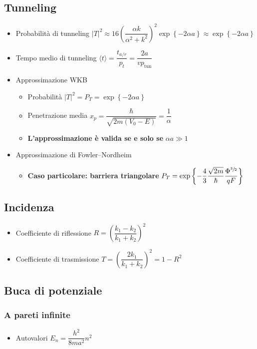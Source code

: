 \documentclass{article}
\begin{document}
\subsection{Tunneling}
\begin{itemize}
  \item Probabilità di tunneling \( \left| T \right| ^ 2 \approx 16 \left( \dfrac{\alpha k}{\alpha^2 + k^2} \right) ^ 2  \exp{ \left\{ -2 \alpha a \right\} } \approx \exp{\left\{-2 \alpha a\right\}} \)
  \item Tempo medio di tunneling \( \langle t \rangle = \dfrac{t_{a/r}}{p_t} = \dfrac{2 a}{v p_{\text{tun}}} \)
  \item Approssimazione WKB
        \begin{itemize}
          \item Probabilità \( \left| T \right| ^ 2 = P_T = \exp{ \left\{ -2 \alpha a \right\} } \)
          \item Penetrazione media \( x_p = \dfrac{\hbar}{\sqrt{2 m (V_0 - E)}} = \dfrac{1}{\alpha} \)
          \item \textbf{L'approssimazione è valida se e solo se} \( \alpha a \gg 1 \)
        \end{itemize}
  \item Approssimazione di Fowler–Nordheim
        \begin{itemize}
          \item \textbf{Caso particolare: barriera triangolare} \( P_T = \exp\left\{ - \dfrac{4}{3} \dfrac{\sqrt{2 m}}{\hbar}  \dfrac{\Phi ^ {\sfrac{3}{2}}}{qF} \right\} \)
        \end{itemize}
\end{itemize}

\subsection{Incidenza}
\begin{itemize}
  \item Coefficiente di riflessione \( R = \left( \dfrac{k_1 - k_2}{k_1 + k_2} \right) ^ 2 \)
  \item Coefficiente di trasmissione \( T = \left( \dfrac{2 k_1}{k_1 + k_2} \right) ^ 2 = 1 - R ^ 2 \)
\end{itemize}

\subsection{Buca di potenziale}

\subsubsection{A pareti infinite}
\begin{itemize}
  \item Autovalori \( E_n = \dfrac{h^2}{8 m a ^2} n^2 \)
\end{itemize}
\end{document}
